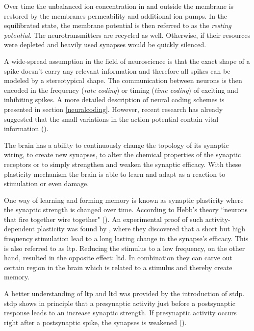 Over time the unbalanced ion concentration in and outside the membrane is restored by the membranes permeability and additional ion pumps. In the equilibrated state, the membrane potential is then referred to as the \emph{resting potential}. The neurotransmitters are recycled as well. Otherwise, if their resources were depleted and heavily used synapses would be quickly silenced.

A wide-spread assumption in the field of neuroscience is that the exact shape of a spike doesn't carry any relevant information and therefore all spikes can be modeled by a stereotypical shape. The communication between neurons is then encoded in the frequency (\emph{rate coding}) or timing (\emph{time coding}) of exciting and inhibiting spikes. A more detailed description of neural coding schemes is presented in section \ref{neuralcoding}. However, recent research has already suggested that the small variations in the action potential contain vital information (\citealp{debanne2013mechanisms}).

The brain has a ability to continuously change the topology of its synaptic wiring, to create new synapses, to alter the chemical properties of the synaptic receptors or to simply strengthen and weaken the synaptic efficacy. With these plasticity mechanism the brain is able to learn and adapt as a reaction to stimulation or even damage.

One way of learning and forming memory is known as synaptic plasticity where the synaptic strength is changed over time. According to Hebb's theory ``neurons that fire together wire together" (\citealp{hebb1949organization}). An experimental proof of such activity-dependent plasticity was found by \citealp{bliss1973long}, where they discovered that a short but high frequency stimulation lead to a long lasting change in the synapse's efficacy. This is also referred to as \gls{ltp}. Reducing the stimulus to a low frequency, on the other hand, resulted in the opposite effect: \gls{ltd}. In combination they can carve out certain region in the brain which is related  to a stimulus and thereby create memory. 

A better understanding of \gls{ltp} and \gls{ltd} was provided by the introduction of \gls{stdp}. \gls{stdp} shows in principle that a presynaptic activity just before a postsynaptic response leads to an increase synaptic strength. If  presynaptic activity occurs right after a postsynaptic spike, the synapses is weakened (\citealp{poo98stdp}). 


